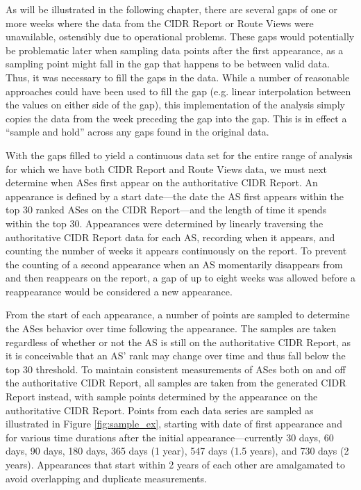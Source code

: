 As will be illustrated in the following chapter, there are several gaps of one
or more weeks where the data from the CIDR Report or Route Views were
unavailable, ostensibly due to operational problems. These gaps would
potentially be problematic later when sampling data points after the first
appearance, as a sampling point might fall in the gap that happens to be
between valid data.  Thus, it was necessary to fill the gaps in the data. While
a number of reasonable approaches could have been used to fill the gap (e.g.
linear interpolation between the values on either side of the gap), this
implementation of the analysis simply copies the data from the week preceding
the gap into the gap. This is in effect a ``sample and hold'' across any gaps
found in the original data.

With the gaps filled to yield a continuous data set for the entire range of
analysis for which we have both CIDR Report and Route Views data, we must next
determine when ASes first appear on the authoritative CIDR Report. An
appearance is defined by a start date---the date the AS first appears within
the top 30 ranked ASes on the CIDR Report---and the length of time it spends
within the top 30. Appearances were determined by linearly traversing the
authoritative CIDR Report data for each AS, recording when it appears, and
counting the number of weeks it appears continuously on the report. To prevent
the counting of a second appearance when an AS momentarily disappears from and
then reappears on the report, a gap of up to eight weeks was allowed before a
reappearance would be considered a new appearance.

From the start of each appearance, a number of points are sampled to determine
the ASes behavior over time following the appearance. The samples are taken
regardless of whether or not the AS is still on the authoritative CIDR Report,
as it is conceivable that an AS' rank may change over time and thus fall below
the top 30 threshold. To maintain consistent measurements of ASes both on and
off the authoritative CIDR Report, all samples are taken from the generated
CIDR Report instead, with sample points determined by the appearance on the
authoritative CIDR Report. Points from each data series are sampled as
illustrated in Figure \ref{fig:sample_ex}, starting with date of first
appearance and for various time durations after the initial
appearance---currently 30 days, 60 days, 90 days, 180 days, 365 days (1 year),
547 days (1.5 years), and 730 days (2 years). Appearances that start within 2
years of each other are amalgamated to avoid overlapping and duplicate
measurements.

